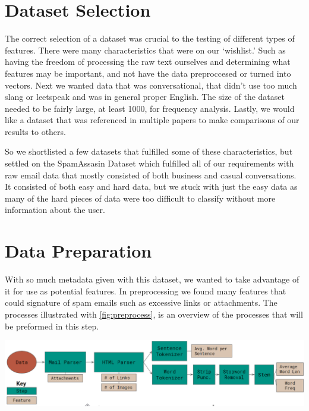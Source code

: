 \documentclass[12pt]{article}
\newenvironment{Figure}
  {\par\medskip\noindent\minipage{\linewidth}}
  {\endminipage\par\medskip}
\begin{document}
\begin{multicols}{2}
        \section{Dataset Selection}
            The correct selection of a dataset was crucial to the testing of 
            different types of features. There were many characteristics that were
            on our `wishlist.' Such as having the freedom of processing 
            the raw text ourselves and determining what features may be important, 
            and not have the data preproccesed or turned into vectors.
            Next we wanted data that was conversational, that didn't use too much 
            slang or leetspeak and was in general proper English. The size of the
            dataset needed to be fairly large, at least 1000, for frequency analysis.
            Lastly, we would like a dataset that was referenced in multiple papers to make comparisons
            of our results to others. 
            
            So we shortlisted a few datasets that fulfilled some of these characteristics, but
            settled on the SpamAssasin Dataset which fulfilled all of our requirements
            with raw email data that mostly consisted of both business and casual
            conversations\cite{sa_dataset}. It consisted of both easy and hard data, but we stuck with
            just the easy data as many of the hard pieces of data were too difficult
            to classify without more information about the user.

        \section{Data Preparation}
            
            With so much metadata given with this dataset, we wanted to take advantage
            of it for use as potential features. In preprocessing we found many features
            that could signature of spam emails such as excessive links or attachments.
            The processes illustrated with \autoref{fig:preprocess}, is an overview
            of the processes that will be preformed in this step.


            \begin{Figure}
                \centering
                \includegraphics[width=\linewidth]{figures/prep.png}
                \label{fig:preprocess}
            \end{Figure}



\end{multicols}
\end{document}

